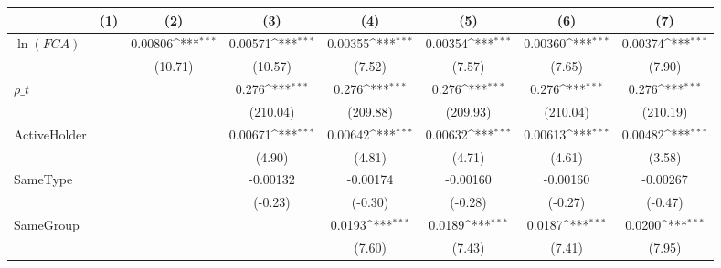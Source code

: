 {
\def\sym#1{\ifmmode^{#1}\else\(^{#1}\)\fi}
\begin{tabular}{l*{7}{c}}
\hline\hline
                    &\multicolumn{1}{c}{(1)}         &\multicolumn{1}{c}{(2)}         &\multicolumn{1}{c}{(3)}         &\multicolumn{1}{c}{(4)}         &\multicolumn{1}{c}{(5)}         &\multicolumn{1}{c}{(6)}         &\multicolumn{1}{c}{(7)}         \\
\hline
$\ln(FCA)$          &                     &     0.00806\sym{***}&     0.00571\sym{***}&     0.00355\sym{***}&     0.00354\sym{***}&     0.00360\sym{***}&     0.00374\sym{***}\\
                    &                     &     (10.71)         &     (10.57)         &      (7.52)         &      (7.57)         &      (7.65)         &      (7.90)         \\
[1em]
$ \rho\_t $          &                     &                     &       0.276\sym{***}&       0.276\sym{***}&       0.276\sym{***}&       0.276\sym{***}&       0.276\sym{***}\\
                    &                     &                     &    (210.04)         &    (209.88)         &    (209.93)         &    (210.04)         &    (210.19)         \\
[1em]
ActiveHolder        &                     &                     &     0.00671\sym{***}&     0.00642\sym{***}&     0.00632\sym{***}&     0.00613\sym{***}&     0.00482\sym{***}\\
                    &                     &                     &      (4.90)         &      (4.81)         &      (4.71)         &      (4.61)         &      (3.58)         \\
[1em]
SameType            &                     &                     &    -0.00132         &    -0.00174         &    -0.00160         &    -0.00160         &    -0.00267         \\
                    &                     &                     &     (-0.23)         &     (-0.30)         &     (-0.28)         &     (-0.27)         &     (-0.47)         \\
[1em]
SameGroup           &                     &                     &                     &      0.0193\sym{***}&      0.0189\sym{***}&      0.0187\sym{***}&      0.0200\sym{***}\\
                    &                     &                     &                     &      (7.60)         &      (7.43)         &      (7.41)         &      (7.95)         \\

\end{tabular}}
